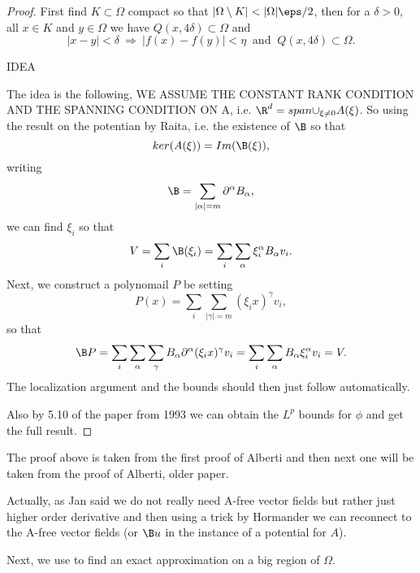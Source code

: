 \begin{proof}
First find $K\subset \Omega$ compact so that $|\Omega\setminus K|<|\Omega|\eps/2$, then for a $\delta>0$, all $x\in K$ and $y\in \Omega$ we have $Q(x,4\delta)\subset \Omega$ and
\begin{equation}
|x-y|<\delta \ \Rightarrow \ |f(x)-f(y)|<\eta \ \text{ and } \ Q(x,4\delta)\subset \Omega.
\end{equation}


{\color{red} IDEA}

The idea is the following, {\color{blue} WE ASSUME THE CONSTANT RANK CONDITION AND THE SPANNING CONDITION ON A}, i.e. $\R^d = span{\cup_{\xi\neq 0} A(\xi)}$. So using the result on the potentian by Raita, i.e. the existence of $\B$ so that
\begin{equation}
ker(A(\xi)) = Im(\B(\xi)),
\end{equation}
writing
\begin{equation}
\B = \sum_{|\alpha|=m} \partial^\alpha B_\alpha,
\end{equation}
we can find $\xi_i$ so that
\begin{equation}
V = \sum_i \B(\xi_i) = \sum_i \sum_\alpha \xi_i^\alpha B_\alpha v_i.
\end{equation}
Next, we construct a polynomail $P$ be setting
\begin{equation}
P(x) = \sum_i \sum_{|\gamma|=m} (\xi_i x)^\gamma v_i,
\end{equation}
so that
\begin{equation}
\B P = \sum_i \sum_\alpha \sum_\gamma B_\alpha \partial^\alpha (\xi_i x)^\gamma v_i = \sum_i \sum_\alpha B_\alpha \xi_i^\alpha v_i = V.
\end{equation}
The localization argument and the bounds should then just follow automatically.

Also by 5.10 of the paper from 1993 we can obtain the $L^p$ bounds for $\phi$ and get the full result.
\end{proof}


The proof above is taken from the first proof of Alberti and then next one will be taken from the proof of Alberti, older paper.

Actually, as Jan said we do not really need A-free vector fields but rather just higher order derivative and then using a trick by Hormander we can reconnect to the A-free vector fields (or $\B u$ in the instance of a potential for $A$).

Next, we use  to find an exact approximation on a big region of $\Omega$.

